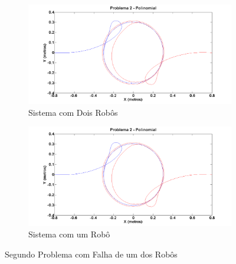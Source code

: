    \begin{figure}[!htb]
   	\centering
   	\begin{subfigure}{1.0\textwidth}
   		\centering
   		\includegraphics[width=.9\linewidth]{./Testes/Problema2/Incremental/2Rb}
   		\caption{Sistema com Dois Robôs}
   		\label{fig:P2Ini}
   	\end{subfigure}
   	\begin{subfigure}{1.0\textwidth}
   		\centering
   		\includegraphics[width=.9\linewidth]{./Testes/Problema2/Incremental/1Rb}
   		\caption{Sistema com um Robô}
   		\label{fig:P2Fim}
   	\end{subfigure}
   	\caption{Segundo Problema com Falha de um dos Robôs}
   	\label{fig:P2}
   \end{figure}
   